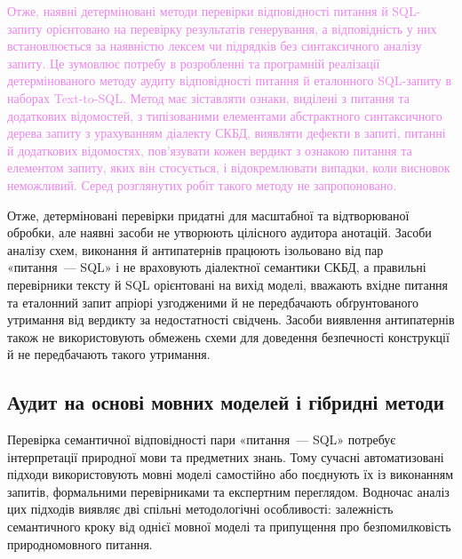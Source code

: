 \documentclass[a4paper,14pt,oneside]{extreport}
\begin{document}
\textcolor{violet}{Отже, наявні детерміновані методи перевірки відповідності питання й SQL-запиту орієнтовано на перевірку результатів генерування, а відповідність у них встановлюється за наявністю лексем чи підрядків без синтаксичного аналізу запиту. Це зумовлює потребу в розробленні та програмній реалізації детермінованого методу аудиту відповідності питання й еталонного SQL-запиту в наборах Text-to-SQL. Метод має зіставляти ознаки, виділені з питання та додаткових відомостей, з типізованими елементами абстрактного синтаксичного дерева запиту з урахуванням діалекту СКБД, виявляти дефекти в запиті, питанні й додаткових відомостях, пов'язувати кожен вердикт з ознакою питання та елементом запиту, яких він стосується, і відокремлювати випадки, коли висновок неможливий. Серед розглянутих робіт такого методу не запропоновано.}

Отже, детерміновані перевірки придатні для масштабної та відтворюваної обробки, але наявні засоби не утворюють цілісного аудитора анотацій. Засоби аналізу схем, виконання й антипатернів працюють ізольовано від пар «питання~--- SQL» і не враховують діалектної семантики СКБД, а правильні перевірники тексту й SQL орієнтовані на вихід моделі, вважають вхідне питання та еталонний запит апріорі узгодженими й не передбачають обґрунтованого утримання від вердикту за недостатності свідчень. Засоби виявлення антипатернів також не використовують обмежень схеми для доведення безпечності конструкції й не передбачають такого утримання.

\subsection{Аудит на основі мовних моделей і гібридні методи}
\label{subsec:llm-audit}

Перевірка семантичної відповідності пари «питання~--- SQL» потребує інтерпретації природної мови та предметних знань. Тому сучасні автоматизовані підходи використовують мовні моделі самостійно або поєднують їх із виконанням запитів, формальними перевірниками та експертним переглядом. Водночас аналіз цих підходів виявляє дві спільні методологічні особливості: залежність семантичного кроку від однієї мовної моделі та припущення про безпомилковість природномовного питання.
\end{document}
